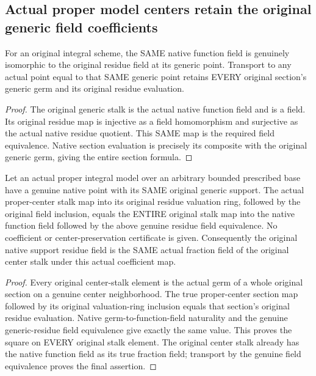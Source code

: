 \subsection{Actual proper model centers retain the original generic field coefficients}

\begin{lemma}
\label{lem:actual-generic-residue-field-equivalence}
\leanok
For an original integral scheme, the SAME native function field is genuinely
isomorphic to the original residue field at its generic point. Transport to
any actual point equal to that SAME generic point retains EVERY original
section's generic germ and its original residue evaluation.
\end{lemma}
\begin{proof}
The original generic stalk is the actual native function field and is a
field. Its original residue map is injective as a field homomorphism and
surjective as the actual native residue quotient. This SAME map is the
required field equivalence. Native section evaluation is precisely its
composite with the original generic germ, giving the entire section formula.
\end{proof}

\begin{lemma}
\label{lem:actual-generic-center-stalk-coefficients}
\leanok
Let an actual proper integral model over an arbitrary bounded prescribed base
have a genuine native point with its SAME original generic support. The
actual proper-center stalk map into its original residue valuation ring,
followed by the original field inclusion, equals the ENTIRE original stalk
map into the native function field followed by the above genuine residue
field equivalence. No coefficient or center-preservation certificate is given.
Consequently the original native support residue field is the SAME actual
fraction field of the original center stalk under this actual coefficient map.
\end{lemma}
\begin{proof}
Every original center-stalk element is the actual germ of a whole original
section on a genuine center neighborhood. The true proper-center section map
followed by its original valuation-ring inclusion equals that section's
original residue evaluation. Native germ-to-function-field naturality and
the genuine generic-residue field equivalence give exactly the same value.
This proves the square on EVERY original stalk element. The original
center stalk already has the native function field as its true fraction
field; transport by the genuine field equivalence proves the final assertion.
\end{proof}

